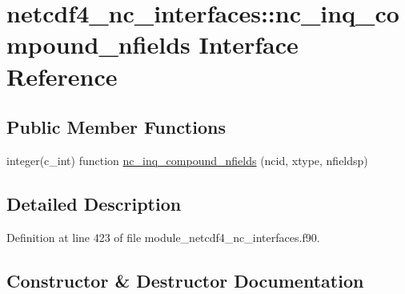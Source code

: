 \hypertarget{interfacenetcdf4__nc__interfaces_1_1nc__inq__compound__nfields}{}\section{netcdf4\+\_\+nc\+\_\+interfaces\+:\+:nc\+\_\+inq\+\_\+compound\+\_\+nfields Interface Reference}
\label{interfacenetcdf4__nc__interfaces_1_1nc__inq__compound__nfields}
\subsection*{Public Member Functions}
\begin{DoxyCompactItemize}
\item 
integer(c\+\_\+int) function \hyperlink{interfacenetcdf4__nc__interfaces_1_1nc__inq__compound__nfields_a738ed4d5ced9e59089dbf0c16cfc6f38}{nc\+\_\+inq\+\_\+compound\+\_\+nfields} (ncid, xtype, nfieldsp)
\end{DoxyCompactItemize}


\subsection{Detailed Description}


Definition at line 423 of file module\+\_\+netcdf4\+\_\+nc\+\_\+interfaces.\+f90.



\subsection{Constructor \& Destructor Documentation}
\mbox{\label{interfacenetcdf4__nc__interfaces_1_1nc__inq__compound__nfields_a738ed4d5ced9e59089dbf0c16cfc6f38}} 
